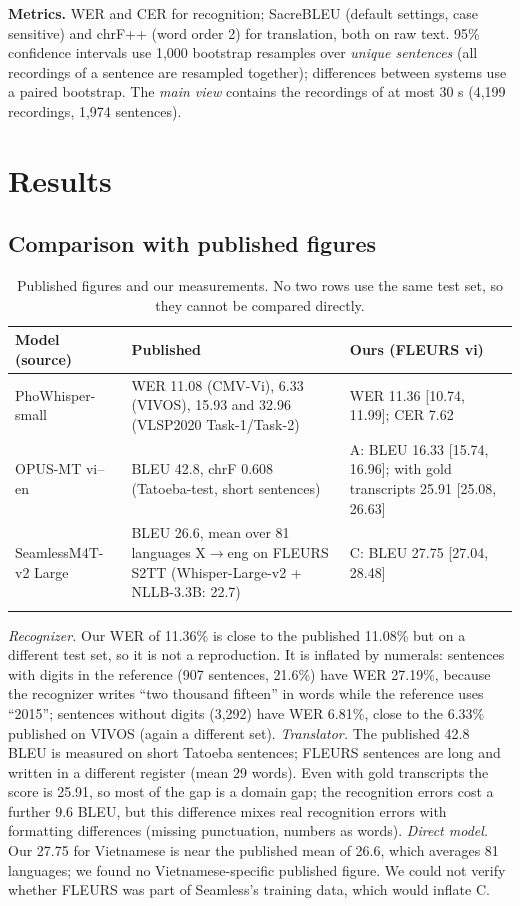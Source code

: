 \documentclass[pdflatex,sn-mathphys-num]{sn-jnl}
\newcommand{\ci}[2]{[#1, #2]}   %
\begin{document}
\textbf{Metrics.} WER and CER for recognition; SacreBLEU (default settings, case sensitive) and chrF++ (word order 2) for translation, both on raw text. 95\% confidence intervals use 1,000 bootstrap resamples over \emph{unique sentences} (all recordings of a sentence are resampled together); differences between systems use a paired bootstrap. The \emph{main view} contains the recordings of at most 30 s (4,199 recordings, 1,974 sentences).

\section{Results}\label{sec:results}

\subsection{Comparison with published figures}\label{sec:gap}

\begin{table}[t]
\caption{Published figures and our measurements. No two rows use the same test set, so they cannot be compared directly.}\label{tab:paper}
\begin{tabular}{@{}p{2.6cm}p{3.1cm}p{3.9cm}@{}}
\toprule
Model (source) & Published & Ours (FLEURS vi)\\
\midrule
PhoWhisper-small~\cite{phowhisper} & WER 11.08 (CMV-Vi), 6.33 (VIVOS), 15.93 and 32.96 (VLSP2020 Task-1/Task-2) & WER 11.36 \ci{10.74}{11.99}; CER 7.62\\
OPUS-MT vi--en~\cite{opusmt} & BLEU 42.8, chrF 0.608 (Tatoeba-test, short sentences) & A: BLEU 16.33 \ci{15.74}{16.96}; with gold transcripts 25.91 \ci{25.08}{26.63}\\
SeamlessM4T-v2 Large~\cite{seamless} & BLEU 26.6, mean over 81 languages X$\rightarrow$eng on FLEURS S2TT (Whisper-Large-v2 + NLLB-3.3B: 22.7) & C: BLEU 27.75 \ci{27.04}{28.48}\\
\botrule
\end{tabular}
\end{table}

\emph{Recognizer.} Our WER of 11.36\% is close to the published 11.08\% but on a different test set, so it is not a reproduction. It is inflated by numerals: sentences with digits in the reference (907 sentences, 21.6\%) have WER 27.19\%, because the recognizer writes ``two thousand fifteen'' in words while the reference uses ``2015''; sentences without digits (3,292) have WER 6.81\%, close to the 6.33\% published on VIVOS (again a different set). \emph{Translator.} The published 42.8 BLEU is measured on short Tatoeba sentences; FLEURS sentences are long and written in a different register (mean 29 words). Even with gold transcripts the score is 25.91, so most of the gap is a domain gap; the recognition errors cost a further 9.6 BLEU, but this difference mixes real recognition errors with formatting differences (missing punctuation, numbers as words). \emph{Direct model.} Our 27.75 for Vietnamese is near the published mean of 26.6, which averages 81 languages; we found no Vietnamese-specific published figure. We could not verify whether FLEURS was part of Seamless's training data, which would inflate C.
\end{document}
